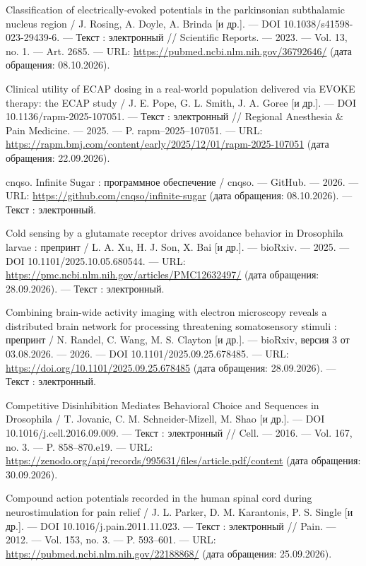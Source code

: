 \begin{list}{}{\setlength{\leftmargin}{10mm}\setlength{\labelwidth}{8mm}\setlength{\labelsep}{2mm}\setlength{\itemsep}{0pt}\setlength{\parsep}{0pt}\setlength{\topsep}{0pt}}
\item[56.] Classification of electrically-evoked potentials in the parkinsonian subthalamic nucleus region / J. Rosing, A. Doyle, A. Brinda [и др.]. — DOI 10.1038/s41598-023-29439-6. — Текст : электронный // Scientific Reports. — 2023. — Vol. 13, no. 1. — Art. 2685. — URL: \url{https://pubmed.ncbi.nlm.nih.gov/36792646/} (дата обращения: 08.10.2026).
\item[57.] Clinical utility of ECAP dosing in a real-world population delivered via EVOKE therapy: the ECAP study / J. E. Pope, G. L. Smith, J. A. Goree [и др.]. — DOI 10.1136/rapm-2025-107051. — Текст : электронный // Regional Anesthesia \& Pain Medicine. — 2025. — P. rapm–2025–107051. — URL: \url{https://rapm.bmj.com/content/early/2025/12/01/rapm-2025-107051} (дата обращения: 22.09.2026).
\item[58.] cnqso. Infinite Sugar : программное обеспечение / cnqso. — GitHub. — 2026. — URL: \url{https://github.com/cnqso/infinite-sugar} (дата обращения: 08.10.2026). — Текст : электронный.
\item[59.] Cold sensing by a glutamate receptor drives avoidance behavior in Drosophila larvae : препринт / L. A. Xu, H. J. Son, X. Bai [и др.]. — bioRxiv. — 2025. — DOI 10.1101/2025.10.05.680544. — URL: \url{https://pmc.ncbi.nlm.nih.gov/articles/PMC12632497/} (дата обращения: 28.09.2026). — Текст : электронный.
\item[60.] Combining brain-wide activity imaging with electron microscopy reveals a distributed brain network for processing threatening somatosensory stimuli : препринт / N. Randel, C. Wang, M. S. Clayton [и др.]. — bioRxiv, версия 3 от 03.08.2026. — 2026. — DOI 10.1101/2025.09.25.678485. — URL: \url{https://doi.org/10.1101/2025.09.25.678485} (дата обращения: 28.09.2026). — Текст : электронный.
\item[61.] Competitive Disinhibition Mediates Behavioral Choice and Sequences in Drosophila / T. Jovanic, C. M. Schneider-Mizell, M. Shao [и др.]. — DOI 10.1016/j.cell.2016.09.009. — Текст : электронный // Cell. — 2016. — Vol. 167, no. 3. — P. 858–870.e19. — URL: \url{https://zenodo.org/api/records/995631/files/article.pdf/content} (дата обращения: 30.09.2026).
\item[62.] Compound action potentials recorded in the human spinal cord during neurostimulation for pain relief / J. L. Parker, D. M. Karantonis, P. S. Single [и др.]. — DOI 10.1016/j.pain.2011.11.023. — Текст : электронный // Pain. — 2012. — Vol. 153, no. 3. — P. 593–601. — URL: \url{https://pubmed.ncbi.nlm.nih.gov/22188868/} (дата обращения: 25.09.2026).

\end{list}

